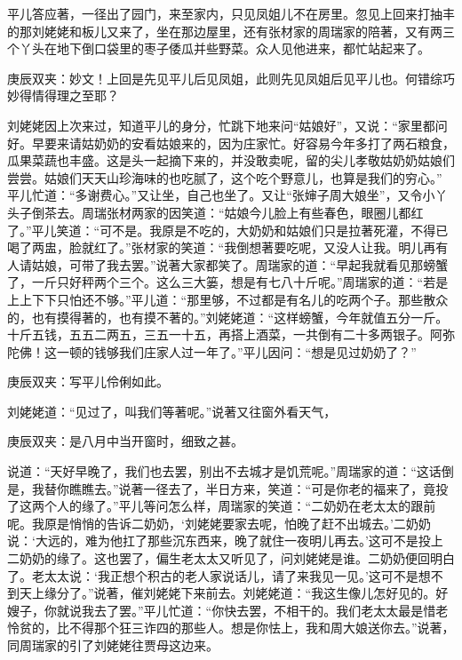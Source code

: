 \begin{parag}
    平儿答应著，一径出了园门，来至家内，只见凤姐儿不在房里。忽见上回来打抽丰的那刘姥姥和板儿又来了，坐在那边屋里，还有张材家的周瑞家的陪著，又有两三个丫头在地下倒口袋里的枣子倭瓜并些野菜。众人见他进来，都忙站起来了。\begin{note}庚辰双夹：妙文！上回是先见平儿后见凤姐，此则先见凤姐后见平儿也。何错综巧妙得情得理之至耶？\end{note}刘姥姥因上次来过，知道平儿的身分，忙跳下地来问“姑娘好”，又说：“家里都问好。早要来请姑奶奶的安看姑娘来的，因为庄家忙。好容易今年多打了两石粮食，瓜果菜蔬也丰盛。这是头一起摘下来的，并没敢卖呢，留的尖儿孝敬姑奶奶姑娘们尝尝。姑娘们天天山珍海味的也吃腻了，这个吃个野意儿，也算是我们的穷心。” 平儿忙道：“多谢费心。”又让坐，自己也坐了。又让“张婶子周大娘坐”，又令小丫头子倒茶去。周瑞张材两家的因笑道：“姑娘今儿脸上有些春色，眼圈儿都红了。”平儿笑道：“可不是。我原是不吃的，大奶奶和姑娘们只是拉著死灌，不得已喝了两盅，脸就红了。”张材家的笑道：“我倒想著要吃呢，又没人让我。明儿再有人请姑娘，可带了我去罢。”说著大家都笑了。周瑞家的道：“早起我就看见那螃蟹了，一斤只好秤两个三个。这么三大篓，想是有七八十斤呢。”周瑞家的道：“若是上上下下只怕还不够。”平儿道：“那里够，不过都是有名儿的吃两个子。那些散众的，也有摸得著的，也有摸不著的。”刘姥姥道：“这样螃蟹，今年就值五分一斤。十斤五钱，五五二两五，三五一十五，再搭上酒菜，一共倒有二十多两银子。阿弥陀佛！这一顿的钱够我们庄家人过一年了。”平儿因问：“想是见过奶奶了？”\begin{note}庚辰双夹：写平儿伶俐如此。\end{note}刘姥姥道：“见过了，叫我们等著呢。”说著又往窗外看天气，\begin{note}庚辰双夹：是八月中当开窗时，细致之甚。\end{note}说道：“天好早晚了，我们也去罢，别出不去城才是饥荒呢。”周瑞家的道：“这话倒是，我替你瞧瞧去。”说著一径去了，半日方来，笑道：“可是你老的福来了，竟投了这两个人的缘了。”平儿等问怎么样，周瑞家的笑道：“二奶奶在老太太的跟前呢。我原是悄悄的告诉二奶奶，‘刘姥姥要家去呢，怕晚了赶不出城去。’二奶奶说：‘大远的，难为他扛了那些沉东西来，晚了就住一夜明儿再去。’这可不是投上二奶奶的缘了。这也罢了，偏生老太太又听见了，问刘姥姥是谁。二奶奶便回明白了。老太太说：‘我正想个积古的老人家说话儿，请了来我见一见。’这可不是想不到天上缘分了。”说著，催刘姥姥下来前去。刘姥姥道：“我这生像儿怎好见的。好嫂子，你就说我去了罢。”平儿忙道：“你快去罢，不相干的。我们老太太最是惜老怜贫的，比不得那个狂三诈四的那些人。想是你怯上，我和周大娘送你去。”说著，同周瑞家的引了刘姥姥往贾母这边来。
\end{parag}


